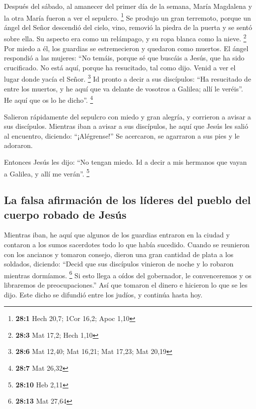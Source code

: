 \begin{paracol}{2}
 Después del sábado, al amanecer del primer día de la
semana, María Magdalena y la otra María fueron a ver el sepulcro.
\footnote{\textbf{28:1} Hech 20,7; 1Cor 16,2; Apoc 1,10} 
Se produjo un gran terremoto, porque un ángel del Señor descendió del
cielo, vino, removió la piedra de la puerta y se sentó sobre ella.
 Su aspecto era como un relámpago, y su ropa blanca como
la nieve. \footnote{\textbf{28:3} Mat 17,2; Hech 1,10} 
Por miedo a él, los guardias se estremecieron y quedaron como muertos.
 El ángel respondió a las mujeres: ``No temáis, porque sé
que buscáis a Jesús, que ha sido crucificado.  No está
aquí, porque ha resucitado, tal como dijo. Venid a ver el lugar donde
yacía el Señor. \footnote{\textbf{28:6} Mat 12,40; Mat 16,21; Mat 17,23;
  Mat 20,19}  Id pronto a decir a sus discípulos: ``Ha
resucitado de entre los muertos, y he aquí que va delante de vosotros a
Galilea; allí le veréis''. He aquí que os lo he dicho''. \footnote{\textbf{28:7}
  Mat 26,32}

 Salieron rápidamente del sepulcro con miedo y gran
alegría, y corrieron a avisar a sus discípulos.  Mientras
iban a avisar a sus discípulos, he aquí que Jesús les salió al
encuentro, diciendo: ``¡Alégrense!'' Se acercaron, se agarraron a sus
pies y le adoraron.

 Entonces Jesús les dijo: ``No tengan miedo. Id a decir a
mis hermanos que vayan a Galilea, y allí me verán''. \footnote{\textbf{28:10}
  Heb 2,11}

\hypertarget{la-falsa-afirmaciuxf3n-de-los-luxedderes-del-pueblo-del-cuerpo-robado-de-jesuxfas}{%
\subsection{La falsa afirmación de los líderes del pueblo del cuerpo
robado de
Jesús}\label{la-falsa-afirmaciuxf3n-de-los-luxedderes-del-pueblo-del-cuerpo-robado-de-jesuxfas}}

 Mientras iban, he aquí que algunos de los guardias
entraron en la ciudad y contaron a los sumos sacerdotes todo lo que
había sucedido.  Cuando se reunieron con los ancianos y
tomaron consejo, dieron una gran cantidad de plata a los soldados,
 diciendo: ``Decid que sus discípulos vinieron de noche y
lo robaron mientras dormíamos. \footnote{\textbf{28:13} Mat 27,64}
 Si esto llega a oídos del gobernador, le convenceremos y
os libraremos de preocupaciones.''  Así que tomaron el
dinero e hicieron lo que se les dijo. Este dicho se difundió entre los
judíos, y continúa hasta hoy.


\end{paracol}
